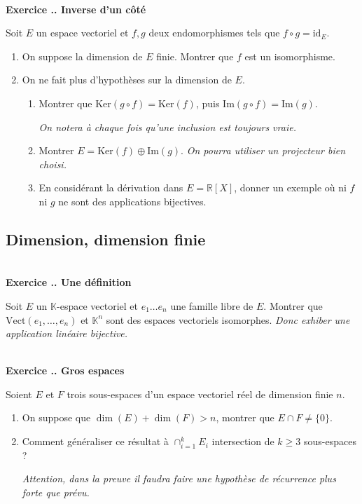 \documentclass{article}
\newcommand{\mb}[1]{\mathbb{#1}}
\newcounter{exo}
\newcommand{\exercice}[1][\null]{\textbf{\\ Exercice \thesection.\theexo. #1} \addtocounter{exo}{1}}
\begin{document}
\exercice[Inverse d'un côté]

Soit $E$ un espace vectoriel et $f,g$ deux endomorphismes tels que $f \circ g = \text{id}_{E}$.

\begin{enumerate}

\item On suppose la dimension de $E$ finie. Montrer que $f$ est un isomorphisme.

\item On ne fait plus d'hypothèses sur la dimension de $E$.

\begin{enumerate}

\item Montrer que $\text{Ker}(g \circ f) = \text{Ker}(f)$, puis $\text{Im}(g \circ f) = \text{Im}(g)$.

\emph{On notera à chaque fois qu'une inclusion est toujours vraie.}

\item Montrer $E = \text{Ker}(f) \oplus \text{Im}(g)$. \emph{On pourra utiliser un projecteur bien choisi.}

\item En considérant la dérivation dans $E = \mb{R}[X]$, donner un exemple où ni $f$ ni $g$ ne sont des applications bijectives.

\end{enumerate}

\end{enumerate}




\subsection{Dimension, dimension finie}

 \exercice[Une définition]

Soit $E$ un $\mb{K}$-espace vectoriel et $e_1 \dots e_n$ une famille libre de $E$. Montrer que $\text{Vect}(e_1, \dots, e_n)$ et $\mb{K}^n$ sont des espaces vectoriels isomorphes. \emph{Donc exhiber une application linéaire bijective.}

\exercice[Gros espaces]

Soient $E$ et $F$ trois sous-espaces d'un espace vectoriel réel de dimension finie $n$.

\begin{enumerate}

\item On suppose que $\dim(E) + \dim(F) > n$, montrer que $E \cap F \neq \{0\}$.

\item Comment généraliser ce résultat à $\cap_{i=1}^k E_i$ intersection de $k \ge 3$ sous-espaces ?

\emph{Attention, dans la preuve il faudra faire une hypothèse de récurrence plus forte que prévu.}


\end{enumerate}
\end{document}
